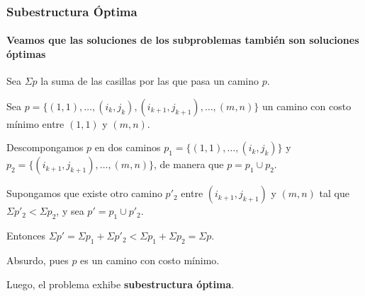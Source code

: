 \documentclass[spanish]{beamer}
\begin{document}
    \begin{frame}
        \frametitle{Subestructura Óptima}
        \framesubtitle{Veamos que las soluciones de los subproblemas también son soluciones óptimas}

        Sea $\Sigma p$ la suma de las casillas por las que pasa un camino $p$.

        \vspace{1em}

        Sea $p = \{(1, 1), \ldots, (i_k, j_k), (i_{k+1}, j_{k+1}), \ldots, (m, n)\}$ un camino con costo mínimo entre $(1,1)$ y $(m,n)$.

        \vspace{1em}

        Descompongamos $p$ en dos caminos $p_1 = \{(1, 1), \ldots, (i_k, j_k)\}$ y $p_2 = \{(i_{k+1}, j_{k+1}), \ldots, (m, n)\}$, de manera que $p = p_1 \cup p_2$.

        \vspace{1em}

        Supongamos que existe otro camino $p'_2$ entre $(i_{k+1}, j_{k+1})$ y $(m,n)$ tal que $\Sigma p'_2 < \Sigma p_2$, y sea $p' = p_1 \cup p'_2$.

        \vspace{1em}

        Entonces $\Sigma p' = \Sigma p_1 + \Sigma p'_2 < \Sigma p_1 + \Sigma p_2 = \Sigma p$.

        \vspace{1em}

        Absurdo, pues $p$ es un camino con costo mínimo.

        \vspace{1em}

        Luego, el problema exhibe \textbf{subestructura óptima}.

    \end{frame}
\end{document}
